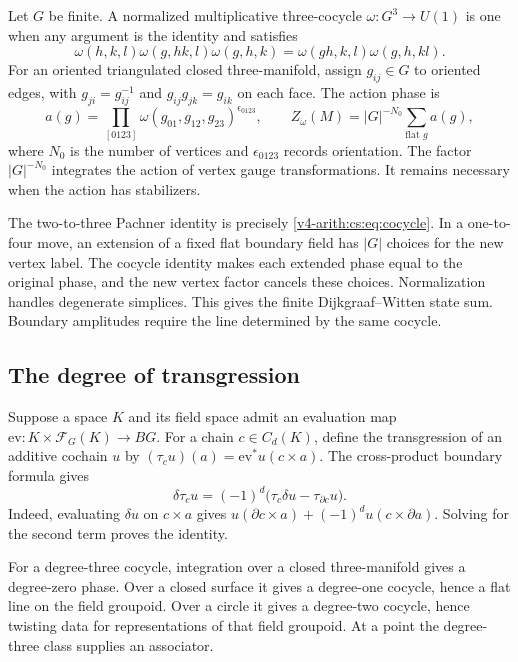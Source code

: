Let \(G\) be finite. A normalized multiplicative three-cocycle
\(\omega:G^3\to U(1)\) is one when any argument is the identity and
satisfies
\begin{equation}
 \omega(h,k,l)\omega(g,hk,l)\omega(g,h,k)
 =\omega(gh,k,l)\omega(g,h,kl).
 \label{v4-arith:cs:eq:cocycle}
\end{equation}
For an oriented triangulated closed three-manifold, assign \(g_{ij}\in G\)
to oriented edges, with \(g_{ji}=g_{ij}^{-1}\) and \(g_{ij}g_{jk}=g_{ik}\)
on each face. The action phase is
\[
 a(g)=\prod_{[0123]}
           \omega(g_{01},g_{12},g_{23})^{\epsilon_{0123}},
 \qquad
 Z_\omega(M)=|G|^{-N_0}\sum_{\text{flat }g}a(g),
\]
where \(N_0\) is the number of vertices and \(\epsilon_{0123}\) records
orientation. The factor \(|G|^{-N_0}\) integrates the action of vertex gauge
transformations. It remains necessary when the action has stabilizers.

The two-to-three Pachner identity is precisely
\eqref{v4-arith:cs:eq:cocycle}. In a one-to-four move, an extension of a
fixed flat boundary field has \(|G|\) choices for the new vertex label. The
cocycle identity makes each extended phase equal to the original phase, and
the new vertex factor cancels these choices. Normalization handles
degenerate simplices. This gives the finite Dijkgraaf--Witten state sum.
Boundary amplitudes require the line determined by the same cocycle.

\subsection{The degree of transgression}

Suppose a space \(K\) and its field space admit an evaluation map
\(\mathrm{ev}:K\times\mathcal F_G(K)\to BG\). For a chain \(c\in C_d(K)\),
define the transgression of an additive cochain \(u\) by
\((\tau_cu)(a)=\mathrm{ev}^*u(c\times a)\). The cross-product boundary
formula gives
\begin{equation}
 \delta\tau_cu=(-1)^d
                  \bigl(\tau_c\delta u-\tau_{\partial c}u\bigr).
 \label{v4-arith:cs:eq:transgression}
\end{equation}
Indeed, evaluating \(\delta u\) on \(c\times a\) gives \(u(\partial c\times
a)+(-1)^du(c\times\partial a)\). Solving for the second term proves the
identity.

For a degree-three cocycle, integration over a closed three-manifold gives a
degree-zero phase. Over a closed surface it gives a degree-one cocycle,
hence a flat line on the field groupoid. Over a circle it gives a degree-two
cocycle, hence twisting data for representations of that field groupoid. At
a point the degree-three class supplies an associator.

